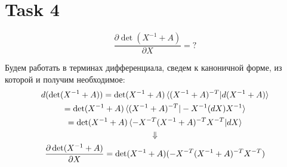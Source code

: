 
\section{Task 4}
\begin{task}
    \begin{equation}
        \frac{\partial \det(X^{-1} + A)}{\partial X} = ?
    \end{equation}
\end{task}

\begin{solution}
    Будем работать в терминах дифференциала, сведем к каноничной форме, из которой и получим необходимое:
    \begin{gather}
        d(\det(X^{-1} + A)) = \det(X^{-1} + A) \braket{(X^{-1} + A)^{-T} | d(X^{-1} + A)} \\
        = \det(X^{-1} + A) \braket{(X^{-1} + A)^{-T} | -X^{-1} (dX) X^{-1}} \\
        = \det(X^{-1} + A) \braket{-X^{-T}(X^{-1} + A)^{-T} X^{-T} | dX} \\
        \Downarrow \\
        \frac{\partial \det(X^{-1} + A)}{\partial X} = \det(X^{-1} + A)(-X^{-T} (X^{-1} + A)^{-T} X^{-T})
    \end{gather}
\end{solution}
